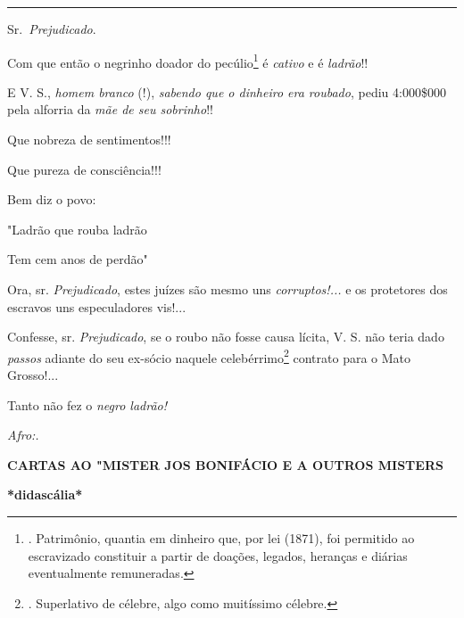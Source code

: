 \begin{center}\rule{0.5\linewidth}{\linethickness}\end{center}

Sr.~\emph{Prejudicado}.

Com que então o negrinho doador do pecúlio\footnote{. Patrimônio,
  quantia em dinheiro que, por lei (1871), foi permitido ao escravizado
  constituir a partir de doações, legados, heranças e diárias
  eventualmente remuneradas.} é \emph{cativo} e é \emph{ladrão}!!

E V. S., \emph{homem branco} (!), \emph{sabendo que o dinheiro era
roubado}, pediu 4:000\$000 pela alforria da \emph{mãe de seu sobrinho}!!

Que nobreza de sentimentos!!!

Que pureza de consciência!!!

Bem diz o povo:

"Ladrão que rouba ladrão

Tem cem anos de perdão"

Ora, sr. \emph{Prejudicado}, estes juízes são mesmo uns
\emph{corruptos!...} e os protetores dos escravos uns especuladores
vis!...

Confesse, sr. \emph{Prejudicado}, se o roubo não fosse causa lícita, V.
S. não teria dado \emph{passos} adiante do seu ex-sócio naquele
celebérrimo\footnote{. Superlativo de célebre, algo como muitíssimo
  célebre.} contrato para o Mato Grosso!...

Tanto não fez o \emph{negro ladrão!}

\emph{Afro:.}

\textbf{CARTAS AO "MISTER JOS BONIFÁCIO E A OUTROS MISTERS}

\textbf{*didascália*}

